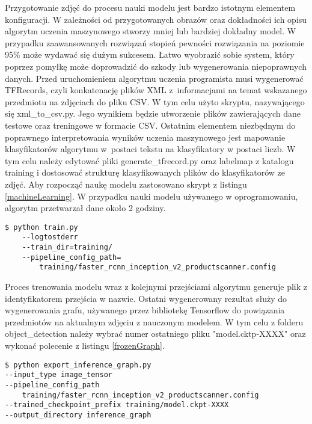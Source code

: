 Przygotowanie zdjęć do procesu nauki modelu jest bardzo istotnym elementem konfiguracji. W zależności od przygotowanych obrazów oraz dokładności ich opisu algorytm uczenia maszynowego stworzy mniej lub bardziej dokładny model. W przypadku zaawansowanych rozwiązań stopień pewności rozwiązania na poziomie 95\% może wydawać się dużym sukcesem. Łatwo wyobrazić sobie system, który poprzez pomyłkę może doprowadzić do szkody lub wygenerowania niepoprawnych danych. Przed uruchomieniem algorytmu uczenia programista musi wygenerować TFRecords, czyli konkatenację plików XML z~informacjami na temat wskazanego przedmiotu na zdjęciach do pliku CSV. W tym celu użyto skryptu, nazywającego się xml\_to\_csv.py. Jego wynikiem będzie utworzenie plików zawierających dane testowe oraz treningowe w formacie CSV. Ostatnim elementem niezbędnym do poprawnego interpretowania wyników uczenia maszynowego jest mapowanie klasyfikatorów algorytmu w~postaci tekstu na klasyfikatory w postaci liczb. W tym celu należy edytować pliki generate\_tfrecord.py oraz labelmap z katalogu training i dostosować strukturę klasyfikowanych plików do klasyfikatorów ze zdjęć. Aby rozpocząć naukę modelu zastosowano skrypt z listingu \ref{machineLearning}. W przypadku nauki modelu używanego w oprogramowaniu, algorytm przetwarzał dane około 2 godziny. 

\begin{lstlisting}[caption={Uruchomienie algorytmu uczenia maszynowego.}, label={machineLearning} ]
$ python train.py 
	--logtostderr 
	--train_dir=training/
	--pipeline_config_path=
	 	training/faster_rcnn_inception_v2_productscanner.config
\end{lstlisting}

Proces trenowania modelu wraz z kolejnymi przejściami algorytmu generuje plik z identyfikatorem przejścia w nazwie. Ostatni wygenerowany rezultat służy do wygenerowania grafu, używanego przez bibliotekę Tensorflow do powiązania przedmiotów na aktualnym zdjęciu z nauczonym modelem. W tym celu z folderu object\_detection należy wybrać numer ostatniego pliku "model.cktp-XXXX" oraz wykonać polecenie z listingu \ref{frozenGraph}.

\begin{lstlisting}[caption={Wygenerowanie grafu modelu uczenia.}, label={frozenGraph} ]
$ python export_inference_graph.py 
--input_type image_tensor 
--pipeline_config_path 
	training/faster_rcnn_inception_v2_productscanner.config 
--trained_checkpoint_prefix training/model.ckpt-XXXX 
--output_directory inference_graph
\end{lstlisting}

